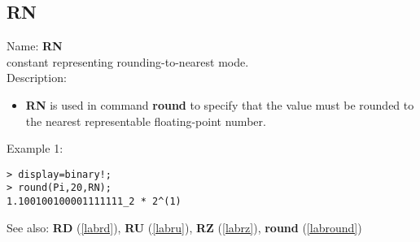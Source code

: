 \subsection{RN}
\label{labRN}
\noindent Name: \textbf{RN}\\
constant representing rounding-to-nearest mode.\\

\noindent Description: \begin{itemize}

\item \textbf{RN} is used in command \textbf{round} to specify that the value must be rounded
   to the nearest representable floating-point number.
\end{itemize}
\noindent Example 1: 
\begin{center}\begin{minipage}{15cm}\begin{Verbatim}[frame=single]
> display=binary!;
> round(Pi,20,RN);
1.100100100001111111_2 * 2^(1)
\end{Verbatim}
\end{minipage}\end{center}
See also: \textbf{RD} (\ref{labrd}), \textbf{RU} (\ref{labru}), \textbf{RZ} (\ref{labrz}), \textbf{round} (\ref{labround})

